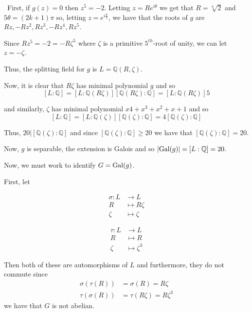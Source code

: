 \documentclass[12pt]{AlgebraQual}
\begin{document}
\begin{solution}$\,$
First, if $g(z)=0$ then $z^5=-2$. Letting $z=Re^{i\theta}$ we get that $R=\sqrt[6]{2}$ and $5\theta=(2k+1)\pi$ so, letting $z=e^{i\frac{\pi}{5}}$, we have that the roots of $g$ are $Rz,-Rz^2,Rz^3,-Rz^4,Rz^5$.

Since $Rz^5=-2=-R\zeta^5$ where $\zeta$ is a primitive $5^{th}$-root of unity, we can let $z=-\zeta$.

Thus, the splitting field for $g$ is $L=\mathbb{Q}(R,\zeta)$.

Now, it is clear that $R\zeta$ has minimal polynomial $g$ and so $$[L:\mathbb{Q}]=[L:\mathbb{Q}(R\zeta)][\mathbb{Q}(R\zeta):\mathbb{Q}]=[L:\mathbb{Q}(R\zeta)]5$$

and similarly, $\zeta$ has minimal polynomial $x4+x^3+x^2+x+1$ and so $$[L:\mathbb{Q}]=[L:\mathbb{Q}(\zeta)][\mathbb{Q}(\zeta):\mathbb{Q}]=4[\mathbb{Q}(\zeta):\mathbb{Q}]$$

Thus, $20|[\mathbb{Q}(\zeta):\mathbb{Q}]$ and since $[\mathbb{Q}(\zeta):\mathbb{Q}]\ge20$ we have that $[\mathbb{Q}(\zeta):\mathbb{Q}]=20.$

Now, $g$ is separable, the extension is Galois and so $|\text{Gal}(g)|=[L:\mathbb{Q}]=20.$

Now, we must work to identify $G=\text{Gal}(g)$.

First, let
\begin{center}
 \begin{minipage}{.3\textwidth}
        \centering
    \begin{align*}
    \sigma:L&\to L\\
    R&\mapsto R\zeta\\
    \zeta&\mapsto \zeta
\end{align*}
\end{minipage}%
\begin{minipage}{.3\textwidth}
        \centering
\begin{align*}
    \tau:L&\to L\\
    R&\mapsto R\\
    \zeta&\mapsto \zeta^3
\end{align*}
\end{minipage}
\end{center}

Then both of these are automorphisms of $L$ and furthermore, they do not commute since \begin{align*}
    \sigma(\tau(R))&=\sigma(R)=R\zeta\\
    \tau(\sigma(R))&=\tau(R\zeta)=R\zeta^3
\end{align*} we have that $G$ is not abelian.


\end{solution}
\end{document}
